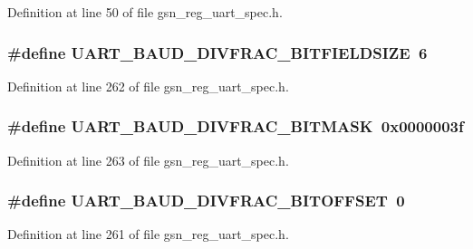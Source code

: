 Definition at line 50 of file gsn\_\-reg\_\-uart\_\-spec.h.

\hypertarget{a00575_a9395f6e94adc5a7b0b25bf21fabf2a10}{
\subsubsection[{UART\_\-BAUD\_\-DIVFRAC\_\-BITFIELDSIZE}]{\setlength{\rightskip}{0pt plus 5cm}\#define UART\_\-BAUD\_\-DIVFRAC\_\-BITFIELDSIZE~6}}
\label{a00575_a9395f6e94adc5a7b0b25bf21fabf2a10}


Definition at line 262 of file gsn\_\-reg\_\-uart\_\-spec.h.

\hypertarget{a00575_a0cce01253fdf8ce89e55e7724c7fa977}{
\subsubsection[{UART\_\-BAUD\_\-DIVFRAC\_\-BITMASK}]{\setlength{\rightskip}{0pt plus 5cm}\#define UART\_\-BAUD\_\-DIVFRAC\_\-BITMASK~0x0000003f}}
\label{a00575_a0cce01253fdf8ce89e55e7724c7fa977}


Definition at line 263 of file gsn\_\-reg\_\-uart\_\-spec.h.

\hypertarget{a00575_aac32136d62b40c985b7298871fe91a05}{
\subsubsection[{UART\_\-BAUD\_\-DIVFRAC\_\-BITOFFSET}]{\setlength{\rightskip}{0pt plus 5cm}\#define UART\_\-BAUD\_\-DIVFRAC\_\-BITOFFSET~0}}
\label{a00575_aac32136d62b40c985b7298871fe91a05}


Definition at line 261 of file gsn\_\-reg\_\-uart\_\-spec.h.

